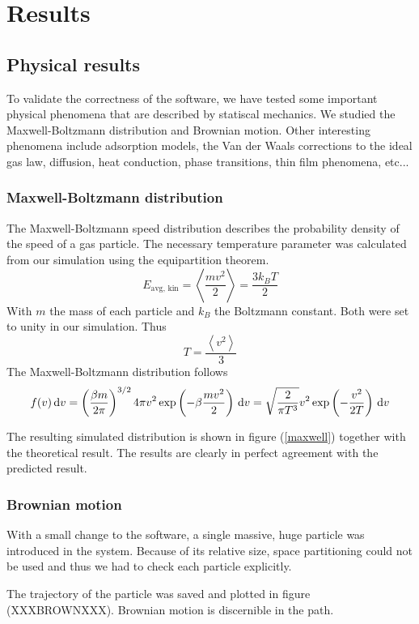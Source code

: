 \section{Results}
\subsection{Physical results}

To validate the correctness of the software, we have tested some important 
physical phenomena that are described by statiscal mechanics. We studied the 
Maxwell-Boltzmann distribution and Brownian motion. Other interesting phenomena 
include adsorption models, the Van der Waals corrections to the ideal gas law, 
diffusion, heat conduction, phase transitions, thin film phenomena, etc...

\subsubsection{Maxwell-Boltzmann distribution}
The Maxwell-Boltzmann speed distribution describes the probability density of 
the speed of a gas particle. The necessary temperature parameter was calculated 
from our simulation using the equipartition theorem.
$$
E_{\textrm{avg, kin}} = \left< \frac{mv^2}{2} \right> = \frac{3k_BT}{2}
$$
With $m$ the mass of each particle and $k_B$ the Boltzmann constant. Both were 
set to unity in our simulation. Thus
$$
T = \frac{\left< v^2 \right>}{3}
$$
The Maxwell-Boltzmann distribution follows
$$
f(v)\,\mathrm d v = \left( \frac{\beta m}{2 \pi} \right)^{3/2} 4 \pi v^2
\exp\left( -\beta \frac{mv^2}{2}\right) \,\mathrm d v =
\sqrt{ \frac{2}{\pi T^3} } v^2 \exp \left(-\frac{v^2}{2T}\right) \,\mathrm d v
$$

The resulting simulated distribution is shown in figure (\ref{maxwell}) 
together with the theoretical result. The results are clearly in perfect 
agreement with the predicted result.

\subsubsection{Brownian motion}
With a small change to the software, a single massive, huge particle was 
introduced in the system. Because of its relative size, space partitioning 
could not be used and thus we had to check each particle explicitly. 


The trajectory of the particle was saved and plotted in figure (XXXBROWNXXX).  
Brownian motion is discernible in the path.


